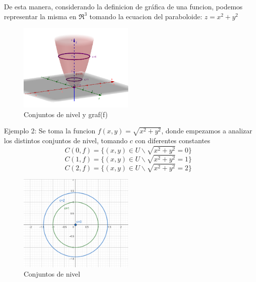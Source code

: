 \begin{definition} 
De esta manera, considerando la definicion de gráfica de una funcion, podemos representar la misma en $\Re^3$ tomando  la ecuacion del paraboloide: $z=x^2+y^2$

\begin{figure}[h!] %
    \centering
    \includegraphics[width=0.5\textwidth]{../figs/conjunto1_r3.png} %
    \caption{Conjuntos de nivel y graf(f)}
    \label{fig:ejemplo} %
\end{figure}



 

Ejemplo 2: Se toma la funcion $f(x,y)=\sqrt{x^2+y^2}$, donde empezamos a analizar los distintos conjuntos de nivel, tomando $c$ con diferentes constantes
 \[
C(0,f)=\{(x,y) \in U \backslash \sqrt{x^2+y^2}=0 \}
\]
 \[
C(1,f)=\{(x,y) \in U \backslash \sqrt{x^2+y^2}=1 \}
\]
 \[
C(2,f)=\{(x,y) \in U \backslash \sqrt{x^2+y^2}=2 \}
 \]

\begin{figure}[h!] %
    \centering
    \includegraphics[width=0.5\textwidth]{../figs/conjunto2_r2.png} %
    \caption{Conjuntos de nivel}
    \label{fig:ejemplo} %
\end{figure}


\end{definition}
